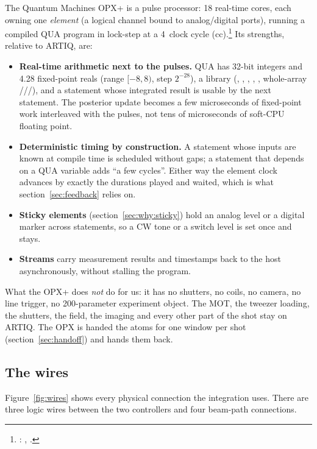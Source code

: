 The Quantum Machines OPX+ is a pulse processor: 18 real-time cores, each
owning one \emph{element} (a logical channel bound to analog/digital ports),
running a compiled QUA program in lock-step at a 4\nsu\ clock cycle
(cc).\footnote{: ,
.} Its strengths, relative to ARTIQ, are:

\begin{itemize}[nosep]
  \item \textbf{Real-time arithmetic next to the pulses.} QUA has 32-bit
    integers and 4.28 fixed-point reals (range $[-8, 8)$, step $2^{-28}$),
    a  library (, , , ,
    , whole-array ///),
    and a  statement whose integrated result is usable by the
    next statement. The posterior update becomes a few microseconds of
    fixed-point work interleaved with the pulses, not tens of microseconds of
    soft-CPU floating point.
  \item \textbf{Deterministic timing by construction.} A statement whose
    inputs are known at compile time is scheduled without gaps; a statement
    that depends on a QUA variable adds ``a few cycles''. Either way the
    element clock advances by exactly the durations played and waited, which
    is what section~\ref{sec:feedback} relies on.
  \item \textbf{Sticky elements} (section~\ref{sec:why:sticky}) hold an
    analog level or a digital marker across statements, so a CW tone or a
    switch level is set once and stays.
  \item \textbf{Streams} carry measurement results and timestamps back to the
    host asynchronously, without stalling the program.
\end{itemize}

What the OPX+ does \emph{not} do for us: it has no shutters, no coils, no
camera, no line trigger, no 200-parameter experiment object. The MOT, the
tweezer loading, the shutters, the field, the imaging and every other part of
the shot stay on ARTIQ. The OPX is handed the atoms for one window per shot
(section~\ref{sec:handoff}) and hands them back.

\subsection{The wires}
\label{sec:why:wires}

Figure~\ref{fig:wires} shows every physical connection the integration uses.
There are three logic wires between the two controllers and four beam-path
connections.

